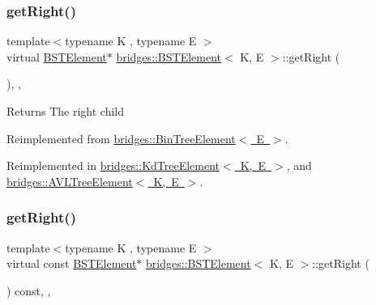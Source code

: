 \mbox{\label{classbridges_1_1_b_s_t_element_a35e93bce32de933522dccde5f2b5ffd9}} 
\subsubsection{\texorpdfstring{get\+Right()}{getRight()}\hspace{0.1cm}{\footnotesize\ttfamily [1/2]}}
{\footnotesize\ttfamily template$<$typename K , typename E $>$ \\
virtual \mbox{\hyperlink{classbridges_1_1_b_s_t_element}{B\+S\+T\+Element}}$\ast$ \mbox{\hyperlink{classbridges_1_1_b_s_t_element}{bridges\+::\+B\+S\+T\+Element}}$<$ K, E $>$\+::get\+Right (\begin{DoxyParamCaption}{ }\end{DoxyParamCaption})\hspace{0.3cm}{\ttfamily [inline]}, {\ttfamily [override]}, {\ttfamily [virtual]}}

\begin{DoxyReturn}{Returns}
The right child 
\end{DoxyReturn}


Reimplemented from \mbox{\hyperlink{classbridges_1_1_bin_tree_element_a5751f2fe38e2364f68dc37939fce060f}{bridges\+::\+Bin\+Tree\+Element$<$ E $>$}}.



Reimplemented in \mbox{\hyperlink{classbridges_1_1_kd_tree_element_a8e1090891a720231c2009d1d222471e9}{bridges\+::\+Kd\+Tree\+Element$<$ K, E $>$}}, and \mbox{\hyperlink{classbridges_1_1_a_v_l_tree_element_a909b46ebf3e8c6a3434762a1f01499e2}{bridges\+::\+A\+V\+L\+Tree\+Element$<$ K, E $>$}}.

\mbox{\label{classbridges_1_1_b_s_t_element_ae4e7b750eada97074a42e7f54b320a29}} 
\subsubsection{\texorpdfstring{get\+Right()}{getRight()}\hspace{0.1cm}{\footnotesize\ttfamily [2/2]}}
{\footnotesize\ttfamily template$<$typename K , typename E $>$ \\
virtual const \mbox{\hyperlink{classbridges_1_1_b_s_t_element}{B\+S\+T\+Element}}$\ast$ \mbox{\hyperlink{classbridges_1_1_b_s_t_element}{bridges\+::\+B\+S\+T\+Element}}$<$ K, E $>$\+::get\+Right (\begin{DoxyParamCaption}{ }\end{DoxyParamCaption}) const\hspace{0.3cm}{\ttfamily [inline]}, {\ttfamily [override]}, {\ttfamily [virtual]}}

